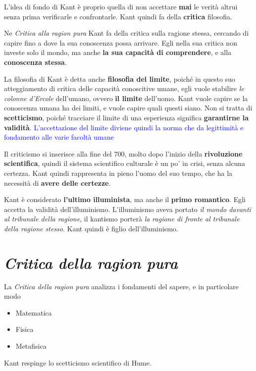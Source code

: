 \documentclass[a4paper, twoside, titlepage]{book}
\renewcommand{\emph}[1]{\textcolor{blue}{#1}}
\begin{document}
L’idea di fondo di Kant è proprio quella di non accettare \textbf{mai} le verità altrui senza prima verificarle e confrontarle. Kant quindi fa della \textbf{critica} filosofia.

Ne \textit{Critica alla ragion pura} Kant fa della critica sulla ragione stessa, cercando di capire fino a dove la sua conoscenza possa arrivare. Egli nella sua critica non investe solo il mondo, ma anche \textbf{la sua capacità di comprendere}, e alla \textbf{conoscenza stessa}.

La filosofia di Kant è detta anche \textbf{filosofia del limite}, poiché in questo suo atteggiamento di critica delle capacità conoscitive umane, egli vuole stabilire \textit{le colonne d’Ercole} dell’umano, ovvero \textbf{il limite} dell’uomo.
Kant vuole capire se la conoscenza umana ha dei limiti, e vuole capire quali questi siano.
Non si tratta di \textbf{scetticismo}, poiché tracciare il limite di una esperienza significa \textbf{garantirne la validità}.
\emph{L’accettazione del limite diviene quindi la norma che da legittimità e fondamento alle varie facoltà umane}

Il criticismo si inserisce alla fine del 700, molto dopo l’inizio della \textbf{rivoluzione scientifica}, quindi il sistema scientifico culturale è un po’ in crisi, senza alcuna certezza.
Kant quindi rappresenta in pieno l’uomo del suo tempo, che ha la necessità di \textbf{avere delle certezze}.

Kant è considerato \textbf{l’ultimo illuminista}, ma anche il \textbf{primo romantico}. Egli accetta la validità dell’illuminismo.
L’illuminismo aveva portato \textit{il mondo davanti al tribunale della ragione}, il kantismo porterà \textit{la ragione di fronte al tribunale della ragione stesso}.
Kant quindi è figlio dell’illuminismo.

\chapter{\textit{Critica della ragion pura}}

La \textit{Critica della ragion pura} analizza i fondamenti del sapere, e in particolare modo
\begin{itemize}
\item Matematica
\item Fisica
\item Metafisica
\end{itemize}

Kant respinge lo scetticismo scientifico di Hume.
\end{document}
